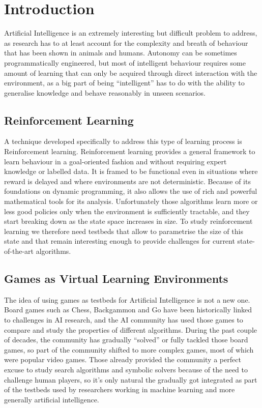 
\chapter{Introduction}

Artificial Intelligence is an extremely interesting but difficult problem to
address, as research has to at least account for the complexity and breath of
behaviour that has been shown in animals and humans. Autonomy can be sometimes
programmatically engineered, but most of intelligent behaviour requires some
amount of learning that can only be acquired through direct interaction with the
environment, as a big part of being ``intelligent'' has to do with the ability
to generalise knowledge and behave reasonably in unseen scenarios.

\section{Reinforcement Learning}

A technique developed specifically to address this type of learning process is
Reinforcement learning. Reinforcement learning provides a general framework to
learn behaviour in a goal-oriented fashion and without requiring expert
knowledge or labelled data. It is framed to be functional even in situations
where reward is delayed and where environments are not deterministic. Because of
its foundations on dynamic programming, it also allows the use of rich and
powerful mathematical tools for its analysis. Unfortunately those algorithms
learn more or less good policies only when the environment is sufficiently
tractable, and they start breaking down as the state space increases in size. To
study reinforcement learning we therefore need testbeds that allow to
parametrise the size of this state and that remain interesting enough to provide
challenges for current state-of-the-art algorithms.

\section{Games as Virtual Learning Environments}

The idea of using games as testbeds for Artificial Intelligence is not a new
one. Board games such as Chess, Backgammon and Go have been historically linked
to challenges in AI research, and the AI community has used those games to
compare and study the properties of different algorithms. During the past couple
of decades, the community has gradually ``solved'' or fully tackled those board
games, so part of the community shifted to more complex games, most of which
were popular video games. Those already provided the community a perfect excuse
to study search algorithms and symbolic solvers because of the need to challenge
human players, so it's only natural the gradually got integrated as part of the
testbeds used by researchers working in machine learning and more generally
artificial intelligence.

